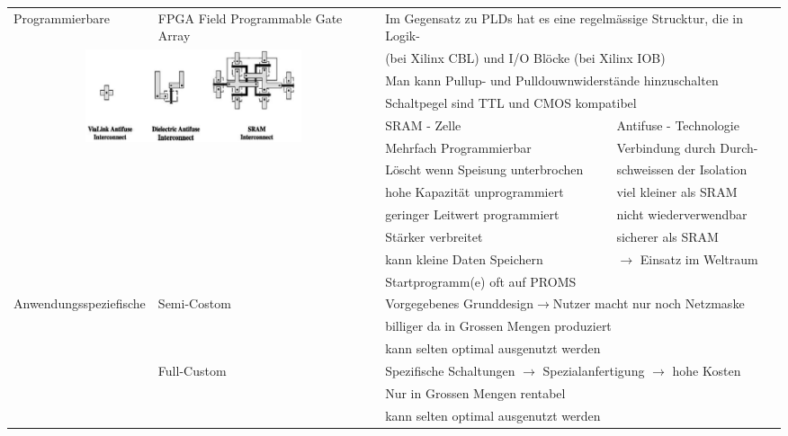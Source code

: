 \begin{tabular}{l l l l}
	Programmierbare	 		& FPGA {\tiny Field Programmable Gate Array}	& \multicolumn{2}{l}{Im Gegensatz zu PLDs hat es eine regelmässige Strucktur, die in Logik-}\\
	\multicolumn{2}{c}{\multirow{10}{*}{\includegraphics[width=180pt]{./bilder/SRAM}}}	&\multicolumn{2}{l}{ (bei Xilinx CBL) und I/O Blöcke (bei Xilinx IOB)}\\
							&												& \multicolumn{2}{l}{ Man kann Pullup- und Pulldouwnwiderstände hinzuschalten }\\
							&												& \multicolumn{2}{l}{ Schaltpegel sind TTL und CMOS kompatibel}\\
							&		& SRAM - Zelle 							& \multicolumn{1}{|l}{ Antifuse - Technologie}\\
							\cline{3-4}
							&		& Mehrfach Programmierbar				& \multicolumn{1}{|l}{ Verbindung durch Durch-}\\
							&		& Löscht wenn Speisung unterbrochen		& \multicolumn{1}{|l}{ schweissen der Isolation}\\
							&		& hohe Kapazität {\tiny unprogrammiert}	& \multicolumn{1}{|l}{ viel kleiner als SRAM}\\
							&		& geringer Leitwert {\tiny programmiert}& \multicolumn{1}{|l}{ nicht wiederverwendbar}\\
							&		& Stärker verbreitet	 				& \multicolumn{1}{|l}{ sicherer als SRAM}\\
							&		& kann kleine Daten Speichern			& \multicolumn{1}{|l}{ $\rightarrow$ Einsatz im Weltraum}\\
							&		& Startprogramm(e) oft auf PROMS		& \multicolumn{1}{|l}{ }\\
	\hline
	Anwendungsspeziefische	& Semi-Costom									& \multicolumn{2}{l}{Vorgegebenes Grunddesign$\rightarrow$Nutzer macht nur noch Netzmaske}\\
							& 												& \multicolumn{2}{l}{billiger da in Grossen Mengen produziert}\\
							& 												& \multicolumn{2}{l}{kann selten optimal ausgenutzt werden}\\
							\cline{2-4}
							& Full-Custom									& \multicolumn{2}{l}{Spezifische Schaltungen $\rightarrow$ Spezialanfertigung $\rightarrow$ hohe Kosten}\\
							& 												& \multicolumn{2}{l}{Nur in Grossen Mengen rentabel}\\
							& 												& \multicolumn{2}{l}{kann selten optimal ausgenutzt werden}\\
\end{tabular}

